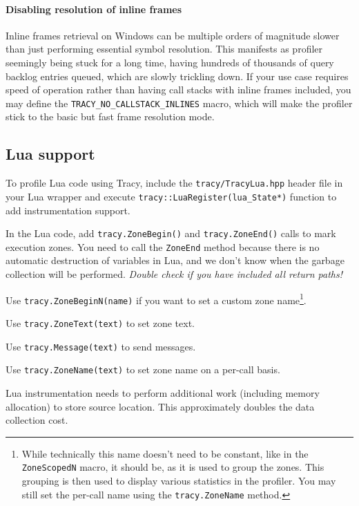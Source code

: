 \documentclass[hidelinks,titlepage,a4paper]{article}
\begin{document}
\paragraph{Disabling resolution of inline frames}

Inline frames retrieval on Windows can be multiple orders of magnitude slower than just performing essential symbol resolution. This manifests as profiler seemingly being stuck for a long time, having hundreds of thousands of query backlog entries queued, which are slowly trickling down. If your use case requires speed of operation rather than having call stacks with inline frames included, you may define the \texttt{TRACY\_NO\_CALLSTACK\_INLINES} macro, which will make the profiler stick to the basic but fast frame resolution mode.

\subsection{Lua support}

To profile Lua code using Tracy, include the \texttt{tracy/TracyLua.hpp} header file in your Lua wrapper and execute \texttt{tracy::LuaRegister(lua\_State*)} function to add instrumentation support.

In the Lua code, add \texttt{tracy.ZoneBegin()} and \texttt{tracy.ZoneEnd()} calls to mark execution zones. You need to call the \texttt{ZoneEnd} method because there is no automatic destruction of variables in Lua, and we don't know when the garbage collection will be performed. \emph{Double check if you have included all return paths!}

Use \texttt{tracy.ZoneBeginN(name)} if you want to set a custom zone name\footnote{While technically this name doesn't need to be constant, like in the \texttt{ZoneScopedN} macro, it should be, as it is used to group the zones. This grouping is then used to display various statistics in the profiler. You may still set the per-call name using the \texttt{tracy.ZoneName} method.}.

Use \texttt{tracy.ZoneText(text)} to set zone text.

Use \texttt{tracy.Message(text)} to send messages.

Use \texttt{tracy.ZoneName(text)} to set zone name on a per-call basis.

Lua instrumentation needs to perform additional work (including memory allocation) to store source location. This approximately doubles the data collection cost.
\end{document}
